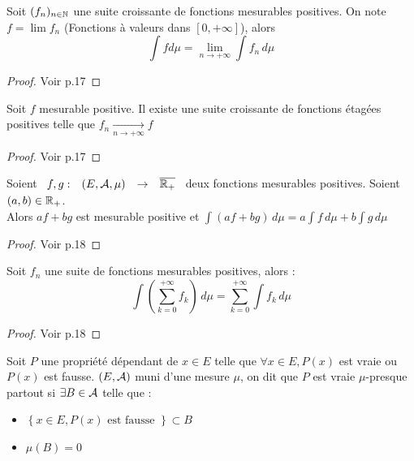 \documentclass[]{report}
\begin{document}
\begin{tm}
        Soit $(f_n)_{n\in\mathbb{N}}$ une suite croissante de fonctions mesurables positives. On note $f=\lim f_n$ (Fonctions à valeurs dans $[0,+\infty]$), alors 
        \[\int f d\mu=\lim_{n\to+\infty}\int f_n\,d\mu\]
\end{tm}

\begin{proof}
    Voir p.17
\end{proof}

\begin{prop}
    Soit $f$ mesurable positive. Il existe une suite croissante de fonctions étagées positives telle que $\displaystyle{f_n\underset{n\to+\infty}{\longrightarrow}f}$
\end{prop}

\begin{proof}
    Voir p.17
\end{proof}

\begin{prop}
    Soient $\begin{array}{ccccc} f,g : & (E,\mathcal{A},\mu) & \to & \overline{\mathbb{R}_+} \end{array}$ deux fonctions mesurables positives. Soient $(a,b)\in\mathbb{R}_+$.\\
    Alors $af+bg$ est mesurable positive et $\int(af+bg)\,d\mu=a\int f\,d\mu+b\int g\,d\mu$
\end{prop}

\begin{proof}
    Voir p.18
\end{proof}

\begin{prop}
    Soit $f_n$ une suite de fonctions mesurables positives, alors : 
    \[\int(\sum_{k=0}^{+\infty}f_k)\,d\mu=\sum_{k=0}^{+\infty}\int f_k\,d\mu\]
\end{prop}

\begin{proof}
    Voir p.18
\end{proof}

\begin{df}
    Soit $P$ une propriété dépendant de $x\in E$ telle que $\forall x\in E,P(x) $ est vraie ou $P(x)$ est fausse. $(E,\mathcal{A})$ muni d'une mesure $\mu$, on dit que $P$ est vraie $\mu$-presque partout si $\exists B \in \mathcal{A}$ telle que :
    \begin{itemize}
        \item $\left\{x\in E,P(x)\text{ est fausse }\right\}\subset B$
        \item $\mu(B)=0$
    \end{itemize}
\end{df}
\end{document}
